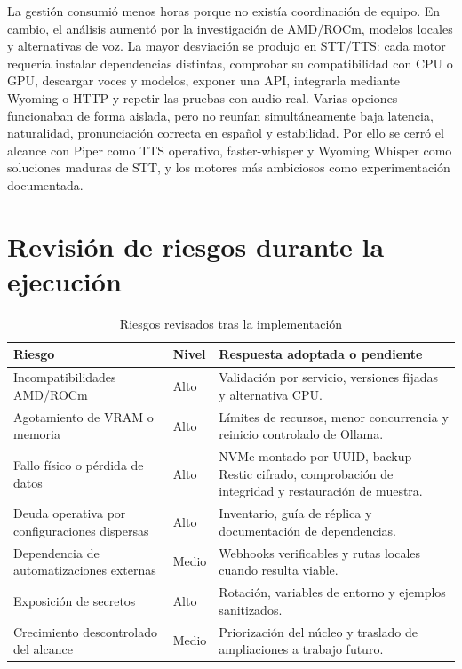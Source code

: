 La gestión consumió menos horas porque no existía coordinación de equipo. En cambio, el análisis aumentó por la investigación de AMD/ROCm, modelos locales y alternativas de voz. La mayor desviación se produjo en STT/TTS: cada motor requería instalar dependencias distintas, comprobar su compatibilidad con CPU o GPU, descargar voces y modelos, exponer una API, integrarla mediante Wyoming o HTTP y repetir las pruebas con audio real. Varias opciones funcionaban de forma aislada, pero no reunían simultáneamente baja latencia, naturalidad, pronunciación correcta en español y estabilidad. Por ello se cerró el alcance con Piper como TTS operativo, faster-whisper y Wyoming Whisper como soluciones maduras de STT, y los motores más ambiciosos como experimentación documentada.

\section{Revisión de riesgos durante la ejecución}
\begin{table}[H]
  \centering
  \caption{Riesgos revisados tras la implementación}
  \label{tab:riesgos-revisados}
  \begin{tabularx}{\textwidth}{XlX}
    \toprule
    Riesgo & Nivel & Respuesta adoptada o pendiente \\
    \midrule
    Incompatibilidades AMD/ROCm & Alto & Validación por servicio, versiones fijadas y alternativa CPU. \\
    Agotamiento de VRAM o memoria & Alto & Límites de recursos, menor concurrencia y reinicio controlado de Ollama. \\
    Fallo físico o pérdida de datos & Alto & NVMe montado por UUID, backup Restic cifrado, comprobación de integridad y restauración de muestra. \\
    Deuda operativa por configuraciones dispersas & Alto & Inventario, guía de réplica y documentación de dependencias. \\
    Dependencia de automatizaciones externas & Medio & Webhooks verificables y rutas locales cuando resulta viable. \\
    Exposición de secretos & Alto & Rotación, variables de entorno y ejemplos sanitizados. \\
    Crecimiento descontrolado del alcance & Medio & Priorización del núcleo y traslado de ampliaciones a trabajo futuro. \\
    \bottomrule
  \end{tabularx}
\end{table}
